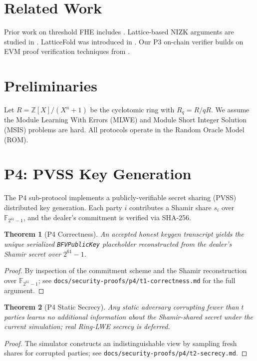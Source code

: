 \documentclass{llncs}
\newtheorem{theorem}{Theorem}[section]
\begin{document}
\section{Related Work}

Prior work on threshold FHE includes \cite{boneh2010threshold}. Lattice-based NIZK arguments
are studied in \cite{lyubashevsky2012lattice}. LatticeFold was introduced in
\cite{latticefold2024}. Our P3 on-chain verifier builds on EVM proof verification techniques
from \cite{groth16evm}.

\section{Preliminaries}

Let $R = \mathbb{Z}[X]/(X^n + 1)$ be the cyclotomic ring with $R_q = R/qR$.
We assume the Module Learning With Errors (MLWE) and Module Short Integer Solution (MSIS)
problems are hard. All protocols operate in the Random Oracle Model (ROM).

\section{P4: PVSS Key Generation}
\label{sec:p4}

The P4 sub-protocol implements a publicly-verifiable secret sharing (PVSS) distributed key
generation. Each party $i$ contributes a Shamir share $s_i$ over $\mathbb{F}_{2^{61}-1}$,
and the dealer's commitment is verified via SHA-256.

\begin{theorem}[P4 Correctness]
\label{thm:p4-t1}
An accepted honest keygen transcript yields the unique serialized \texttt{BFVPublicKey}
placeholder reconstructed from the dealer's Shamir secret over $2^{61}-1$.
\end{theorem}
\begin{proof}
By inspection of the commitment scheme and the Shamir reconstruction over $\mathbb{F}_{2^{61}-1}$;
see \texttt{docs/security-proofs/p4/t1-correctness.md} for the full argument.
\end{proof}

\begin{theorem}[P4 Static Secrecy]
\label{thm:p4-t2}
Any static adversary corrupting fewer than $t$ parties learns no additional information about
the Shamir-shared secret under the current simulation; real Ring-LWE secrecy is deferred.
\end{theorem}
\begin{proof}
The simulator constructs an indistinguishable view by sampling fresh shares for corrupted
parties; see \texttt{docs/security-proofs/p4/t2-secrecy.md}.
\end{proof}
\end{document}

